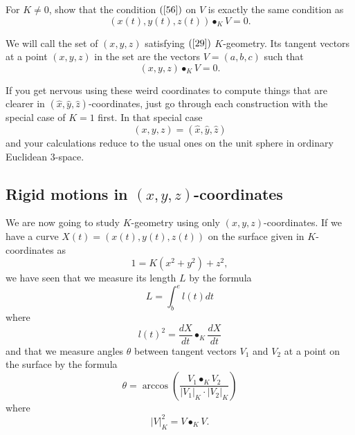 \begin{exercise}
\label{82}For $K\neq0$, show that the condition $\left(  \ref{56}\right)  $ on
$V$ is exactly the same condition as%
\[
\left(  x\left(  t\right)  ,y\left(  t\right)  ,z\left(  t\right)  \right)
\bullet_{K}V=0.
\]

\end{exercise}

We will call the set of $\left(  x,y,z\right)  $ satisfying $\left(
\ref{29}\right)  $ $K$-geometry. Its tangent vectors at a point $\left(
x,y,z\right)  $ in the set are the vectors $V=\left(  a,b,c\right)  $ such
that%
\[
\left(  x,y,z\right)  \bullet_{K}V=0.
\]


If you get nervous using these weird coordinates to compute things
that are clearer in $\left( \hat{x},\hat{y},\hat{z}\right)
$-coordinates, just go through each construction with the special case
of $K=1$ first.  In that special case
\[
\left(  x,y,z\right)  =\left(  \hat{x},\hat{y},\hat{z}\right)
\]
and your calculations reduce to the usual ones on the unit sphere in ordinary
Euclidean $3$-space.

\subsection*{Rigid motions in $\left(  x,y,z\right)  $-coordinates}

We are now going to study $K$-geometry using only $\left(  x,y,z\right)
$-coordinates. If we have a curve $X\left(  t\right)  =\left(  x\left(
t\right)  ,y\left(  t\right)  ,z\left(  t\right)  \right)  $ on the surface
given in $K$-coordinates as%
\begin{equation}
1=K\left(  x^{2}+y^{2}\right)  +z^{2}, \label{86}%
\end{equation}
we have seen that we measure its length $L$ by the formula%
\begin{equation}
L=%
{\displaystyle\int\nolimits_{b}^{e}}
l\left(  t\right)  dt \label{60}%
\end{equation}
where
\begin{equation}
l\left(  t\right)  ^{2}=\frac{dX}{dt}\bullet_{K}\frac{dX}{dt} \label{61}%
\end{equation}
and that we measure angles $\theta$ between tangent vectors $V_{1}$ and
$V_{2}$ at a point on the surface by the formula%
\[
\theta=\arccos\left(  \frac{V_{1}\bullet_{K}V_{2}}{\left\vert
V_{1}\right\vert _{K}\cdot\left\vert V_{2}\right\vert
_{K}}\right)
\]
where%
\[
\left\vert V\right\vert _{K}^{2}=V\bullet_{K}V.
\]


